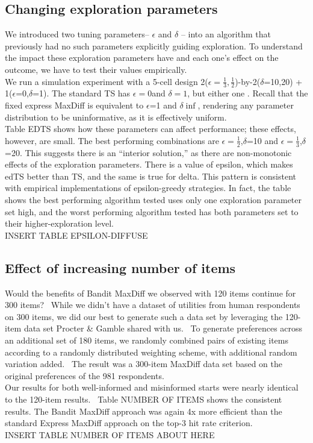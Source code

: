 \documentclass[mksc,blindrev]{informs3} %
\begin{document}
\subsection{Changing exploration parameters}
We introduced two tuning parameters– $\epsilon$ and $\delta$ –  into an algorithm that previously had no such parameters explicitly guiding exploration. To understand the impact these exploration parameters have and each one’s effect on the outcome, we have to test their values empirically. \\
We run a simulation experiment with a 5-cell design 2($\epsilon=\frac{1}{3}, \frac{1}{2}$)-by-2($\delta$=10,20) + 1($\epsilon$=0,$\delta$=1).  The standard TS has $\epsilon=0$and $\delta=1$, but either one . Recall that the fixed express MaxDiff is equivalent to $\epsilon$=1 and $\delta\inf$, rendering any parameter distribution to be uninformative, as it is effectively uniform.\\
Table EDTS shows how these parameters can affect performance; these effects, however, are small. The best performing combinations are $\epsilon=\frac{1}{2}$,$\delta$=10 and $\epsilon=\frac{1}{3}$,$\delta$=20. This suggests there is an “interior solution,” as there are non-monotonic effects of the exploration parameters. There is a value of epsilon, which makes edTS better than TS, and the same is true for delta. This pattern is consistent with empirical implementations of epsilon-greedy strategies. In fact, the table shows the best performing algorithm tested uses only one exploration parameter set high, and the worst performing algorithm tested has both parameters set to their higher-exploration level.\\
INSERT TABLE EPSILON-DIFFUSE\\
\subsection{Effect of increasing number of items}
Would the benefits of Bandit MaxDiff we observed with 120 items continue for 300 items?  While we didn't have a dataset of utilities from human respondents on 300 items, we did our best to generate such a data set by leveraging the 120-item data set Procter \& Gamble shared with us.  To generate preferences across an additional set of 180 items, we randomly combined pairs of existing items according to a randomly distributed weighting scheme, with additional random variation added.  The result was a 300-item MaxDiff data set based on the original preferences of the 981 respondents.\\
Our results for both well-informed and misinformed starts were nearly identical to the 120-item results.  Table NUMBER OF ITEMS shows the consistent results. The Bandit MaxDiff approach was again 4x more efficient than the standard Express MaxDiff approach on the top-3 hit rate criterion. \\
INSERT TABLE NUMBER OF ITEMS ABOUT HERE\\
\end{document}
